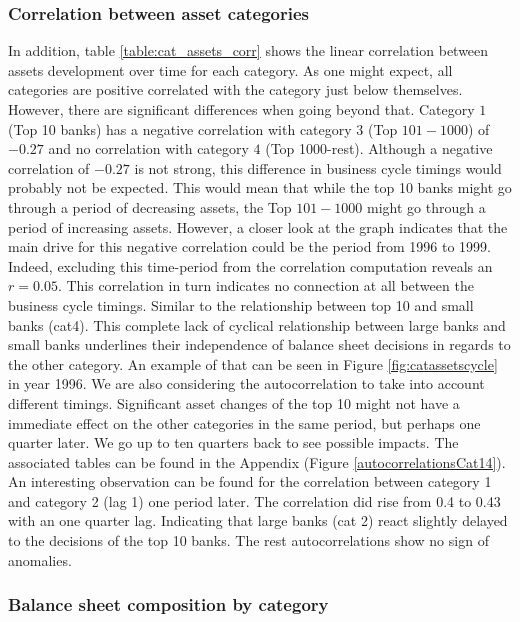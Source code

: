 \documentclass[12pt, a4paper]{article} %
\begin{document}
\subsubsection{Correlation between asset categories}
In addition, table \ref{table:cat_assets_corr} shows the linear correlation between assets development over time for each category. As one might expect, all categories are positive correlated with the category just below themselves. However, there are significant differences when going beyond that. Category $1$ (Top 10 banks) has a negative correlation with category $3$ (Top $101-1000$) of $-0.27$ and no correlation with category $4$ (Top 1000-rest). Although a negative correlation of $-0.27$ is not strong, this difference in business cycle timings would probably not be expected. 
This would mean that while the top 10 banks might go through a period of decreasing assets, the Top $101-1000$ might go through a period of increasing assets. However, a closer look at the graph indicates that the main drive for this negative correlation could be the period from 1996 to 1999. Indeed, excluding this time-period from the correlation computation reveals an $r=0.05$. This correlation in turn indicates no connection at all between the business cycle timings. Similar to the relationship between top 10 and small banks (cat4). This complete lack of cyclical relationship between large banks and small banks underlines their independence of balance sheet decisions in regards to the other category. 
An example of that can be seen in Figure \ref{fig:catassetscycle} in year 1996. 
We are also considering the autocorrelation to take into account different timings. Significant asset changes of the top 10 might not have a immediate effect on the other categories in the same period, but perhaps one quarter later. We go up to ten quarters back to see possible impacts. The associated tables can be found in the Appendix (Figure \ref{autocorrelationsCat14}). An interesting observation can be found for the correlation between category 1 and category 2 (lag 1) one period later. The correlation did rise from 0.4 to 0.43 with an one quarter lag. Indicating that large banks (cat 2) react slightly delayed to the decisions of the top 10 banks. The rest autocorrelations show no sign of anomalies. 

\subsubsection{Balance sheet composition by category}
\end{document}
